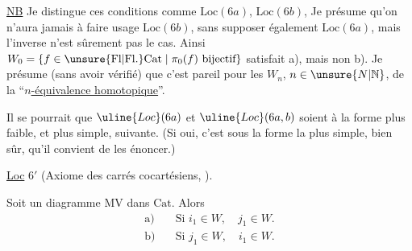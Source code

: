 

\uline{NB}  Je distingue ces conditions comme $\mathrm{Loc}(6a)$,  $\mathrm{Loc}(6b)$,  Je présume qu'on n'aura jamais à faire usage  $\mathrm{Loc}(6b)$, sans supposer également $\mathrm{Loc}(6a)$, mais l'inverse n'est sûrement pas le cas. Ainsi $W_0=\{f\in\unsure{\mathrm{Fl}|\mathrm{Fl.}}\mathrm{Cat}\mid\pi_0(f)\ \text{bijectif}\}$ satisfait a), mais non b). Je présume (sans avoir vérifié) que c'est pareil pour les $W_n$, $n\in\unsure{N|\mathbb N}$, de la ``\uline{$n$-équivalence homotopique}''.

Il se pourrait que $\uline{Loc}(6a)$ et $\uline{Loc}(6a,b)$ soient  à la forme plus faible, et plus simple, suivante. (Si oui, c'est sous la forme la plus simple, bien sûr, qu'il convient de les énoncer.)

\uline{Loc} $6'$ (Axiome des carrés cocartésiens, ).

Soit
un diagramme  $\mathrm{MV}$ dans $\mathrm{Cat}$. Alors
\[
\begin{aligned}
\text{a)}\quad&\text{Si } i_1\in W,\quad j_1\in W.\\
\text{b)}\quad&\text{Si } j_1\in W,\quad i_1\in W.
\end{aligned}
\]

